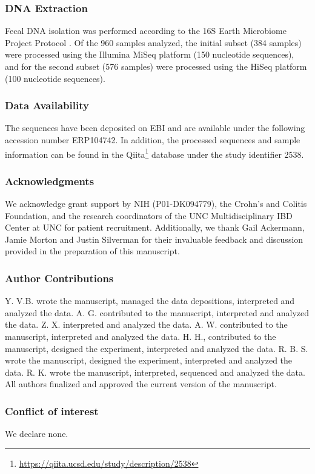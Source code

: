 \subsubsection{DNA Extraction}

Fecal DNA isolation was performed according to the 16S Earth Microbiome Project Protocol \cite{RN164}. Of the 960 samples analyzed, the initial subset (384 samples)  were processed using the Illumina MiSeq platform (150 nucleotide sequences), and for the second subset (576 samples) were processed using the HiSeq platform (100 nucleotide sequences).

\subsubsection{Data Availability}

The sequences have been deposited on EBI and are available under the following
accession number ERP104742.  In addition, the processed sequences and sample
information can be found in the
Qiita\footnote{\url{https://qiita.ucsd.edu/study/description/2538}} database
under the study identifier 2538.


\subsubsection{Acknowledgments}
We acknowledge grant support by NIH (P01-DK094779), the Crohn's and Colitis Foundation, and the research coordinators of the UNC Multidisciplinary IBD Center at UNC for patient recruitment. Additionally, we thank Gail Ackermann, Jamie Morton and Justin Silverman for their invaluable feedback and discussion provided in the preparation of this manuscript.

\subsubsection{Author Contributions}

Y. V.B. wrote the manuscript, managed the data depositions, interpreted and analyzed the data. A. G. contributed to the manuscript, interpreted and analyzed the data. Z. X. interpreted and analyzed the data. A. W. contributed to the manuscript, interpreted and analyzed the data. H. H., contributed to the manuscript, designed the experiment, interpreted and analyzed the data. R. B. S. wrote the manuscript, designed the experiment, interpreted and analyzed the data. R. K. wrote the manuscript, interpreted, sequenced and analyzed the data. All authors finalized and approved the current version of the manuscript.

\subsubsection{Conflict of interest}
We declare none.
